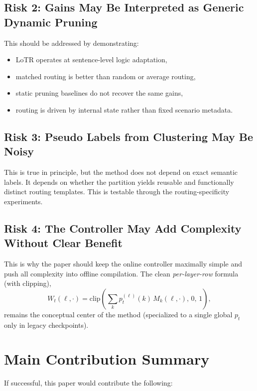 \documentclass[11pt]{article}
\begin{document}
\subsection{Risk 2: Gains May Be Interpreted as Generic Dynamic Pruning}

This should be addressed by demonstrating:
\begin{itemize}[leftmargin=1.5em]
    \item LoTR operates at sentence-level logic adaptation,
    \item matched routing is better than random or average routing,
    \item static pruning baselines do not recover the same gains,
    \item routing is driven by internal state rather than fixed scenario metadata.
\end{itemize}

\subsection{Risk 3: Pseudo Labels from Clustering May Be Noisy}

This is true in principle, but the method does not depend on exact semantic labels. It depends on whether the partition yields reusable and functionally distinct routing templates. This is testable through the routing-specificity experiments.

\subsection{Risk 4: The Controller May Add Complexity Without Clear Benefit}

This is why the paper should keep the online controller maximally simple and push all complexity into offline compilation. The clean \emph{per-layer-row} formula (with clipping),
\[
W_t(\ell,\cdot)=\mathrm{clip}\!\left(\sum_k p_t^{(\ell)}(k)\,M_k(\ell,\cdot),\,0,\,1\right),
\]
remains the conceptual center of the method (specialized to a single global $p_t$ only in legacy checkpoints).

\section{Main Contribution Summary}

If successful, this paper would contribute the following:
\end{document}
